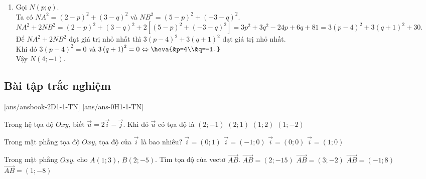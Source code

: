 \begin{bt}
{\begin{enumerate}
			\item Gọi $N(p;q)$.\\
			Ta có $NA^2=(2-p)^2+(3-q)^2$ và $NB^2=(5-p)^2+(-3-q)^2$.\\
			$NA^2+2NB^2=(2-p)^2+(3-q)^2+2[(5-p)^2+(-3-q)^2]=3p^2+3q^2-24p+6q+81=3\left(p-4\right)^2+3\left(q+1\right)^2+30$.\\
			Để $NA^2+2NB^2$ đạt giá trị nhỏ nhất thì $3\left(p-4\right)^2+3\left(q+1\right)^2$ đạt giá trị nhỏ nhất.\\
			Khi đó $3\left(p-4\right)^2=0$ và $3\left(q+1\right)^2=0\Leftrightarrow\heva{&p=4\\&q=-1.}$\\
			Vậy $N(4;-1)$.
		\end{enumerate}
	}
\end{bt}

\subsection{Bài tập trắc nghiệm}
[ans/ansbook-2D1-1-TN]
[ans/ans-0H1-1-TN]
\begin{ex}%
	Trong hệ tọa độ $Oxy$, biết $\overrightarrow{u}=2\overrightarrow{i}-\overrightarrow{j}$. Khi đó $\overrightarrow{u}$ có tọa độ là
	\choice
	{\True $(2;-1)$}
	{$(2;1)$}
	{$(1;2)$}
	{$(1;-2)$}
\end{ex}
\begin{ex}%
	Trong mặt phẳng tọa độ $Oxy$, tọa độ của $\overrightarrow{i}$ là bao nhiêu?
	\choice
	{$\overrightarrow{i} = (0; 1)$}
	{$\overrightarrow{i} = (-1; 0)$}
	{$\overrightarrow{i} = (0; 0)$}
	{\True $\overrightarrow{i} = (1; 0)$}
\end{ex}
\begin{ex}%
	Trong mặt phẳng $Oxy$, cho $A(1;3)$, $B(2;-5)$. Tìm tọa độ của vectơ $\overrightarrow{AB}$.
	\choice
	{$\overrightarrow{AB}=(2;-15)$}
	{$\overrightarrow{AB}=(3;-2)$}
	{$\overrightarrow{AB}=(-1;8)$}
	{\True $\overrightarrow{AB}=(1;-8)$}
\end{ex}
